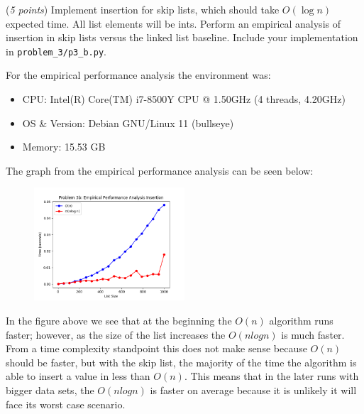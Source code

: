\documentclass{hw}
\begin{document}
\begin{problem}
\begin{subproblem}
(\textit{5 points}) Implement insertion for skip lists, which should take $O(\log n)$ expected time.
All list elements will be ints.
Perform an empirical analysis of insertion in skip lists versus the linked list baseline.
Include your implementation in \texttt{problem\_3/p3\_b.py}.
\end{subproblem}
\begin{solution}
For the empirical performance analysis the environment was:
        \begin{itemize}
            \item CPU: Intel(R) Core(TM) i7-8500Y CPU @ 1.50GHz (4 threads, 4.20GHz)
            \item OS \& Version: Debian GNU/Linux 11 (bullseye)
            \item Memory: 15.53 GB
        \end{itemize}
            
        The graph from the empirical performance analysis can be seen below:
\begin{figure}[ht]
  \centering
      \includegraphics[width=0.5\textwidth]{figures/problem-3b.png}
\end{figure}

In the figure above we see that at the beginning the $O(n)$ algorithm runs faster; however, as the size of the list increases the $O(nlogn)$ is much faster. From a time complexity standpoint this does not make sense because $O(n)$ should be faster, but with the skip list, the majority of the time the algorithm is able to insert a value in less than $O(n)$. This means that in the later runs with bigger data sets, the $O(nlogn)$ is faster on average because it is unlikely it will face its worst case scenario.
\end{solution}



\end{problem}
\end{document}
